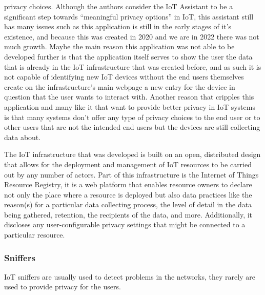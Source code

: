 \documentclass[conference]{IEEEtran}
\begin{document}
privacy choices. Although the authors consider the IoT Assistant to be a significant
step towards ``meaningful privacy options'' in IoT, this assistant still has
many issues such as this application is still in the early stages of it's
existence, and because this was created in 2020 and we are in 2022 there was
not much growth. Maybe the main reason this application was not able to be
developed further is that the application itself serves to show the user the
data that is already in the IoT infrastructure that was created before, and
as such it is not capable of identifying new IoT devices without the end users
themselves create on the infrastructure's main webpage \cite{DasPersonalized}
a new entry for the device in question that the user wants to interact with.
Another reason that cripples this application and many like it that want to
provide better privacy in IoT systems is that many systems don't offer any
type of privacy choices to the end user or to other users that are not the
intended end users but the devices are still collecting data about.

The IoT infrastructure that was developed \cite{DasPersonalized} is built on
an open, distributed design that allows for the deployment and management of
IoT resources to be carried out by any number of actors. Part of this infrastructure
is the Internet of Things Resource Registry, it is a web platform that enables
resource owners to declare not only the place where a resource is deployed
but also data practices like the reason(s) for a particular data collecting
process, the level of detail in the data being gathered, retention, the recipients
of the data, and more. Additionally, it discloses any user-configurable privacy
settings that might be connected to a particular resource.

\subsubsection{Sniffers}

IoT sniffers are usually used to detect problems in the networks, they rarely
are used to provide privacy for the users.
\end{document}
